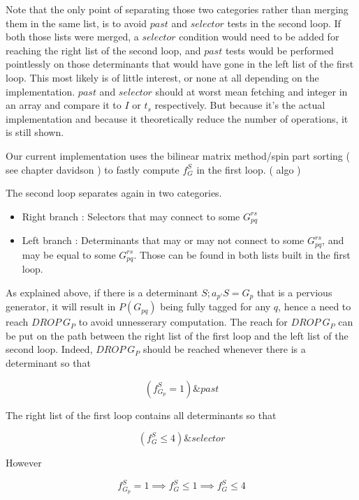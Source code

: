 \documentclass[./thesis.tex]{subfiles}
\begin{document}
Note that the only point of separating those two categories rather than merging them in the same list, is to avoid $past$ and $selector$ tests in the second loop. If both those lists were merged, a $selector$ condition would need to be added for reaching the right list of the second loop, and $past$ tests would be performed pointlessly on those determinants that would have gone in the left list of the first loop.
This most likely is of little interest, or none at all depending on the implementation. $past$ and $selector$ should at worst mean fetching and integer in an array and compare it to $I$ or $t_s$ respectively. But because it's the actual implementation and because it theoretically reduce the number of operations, it is still shown.

Our current implementation uses the bilinear matrix method/spin part sorting ( see chapter davidson ) to fastly compute $f_G^S$ in the first loop. ( algo )


The second loop separates again in two categories.

\begin{itemize}
\item
Right branch : Selectors that may connect to some $G_{pq}^{rs}$
\item
Left branch : Determinants that may or may not connect to some $G_{pq}^{rs}$, and may be equal to some $G_{pq}^{rs}$. Those can be found in both lists built in the first loop.
\end{itemize}

As explained above, if there is a determinant $S ; a_{p'}S = G_{p}$ that is a pervious generator, it will result in $P(G_{pq})$ being fully tagged for any $q$, hence a need to reach $DROP\ G_P$ to avoid unnesserary computation.
The reach for $DROP\ G_P$ can be put on the path between the right list of the first loop and the left list of the second loop.
Indeed, $DROP\ G_P$ should be reached whenever there is a determinant so that


\begin{equation}
(f^S_{G_{p}} = 1) \& past
\end{equation}


The right list of the first loop contains all determinants so that


\begin{equation}
(f^S_G \leq 4) \& selector
\end{equation}


However 


\begin{equation}
f^S_{G_{p}} = 1 \implies f^S_G \leq 1 \implies f^S_G \leq 4
\end{equation}
\end{document}
